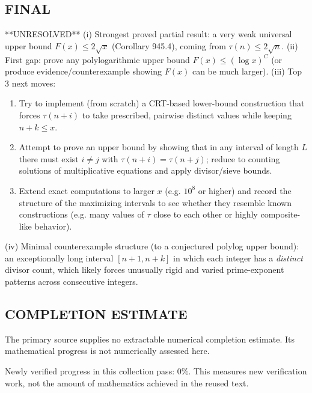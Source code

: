 \subsection*{FINAL}
**UNRESOLVED**
(i) Strongest proved partial result: a very weak universal upper bound $F(x)\le 2\sqrt{x}$ (Corollary 945.4), coming from $\tau(n)\le 2\sqrt{n}$.
(ii) First gap: prove any polylogarithmic upper bound $F(x)\le (\log x)^C$ (or produce evidence/counterexample showing $F(x)$ can be much larger).
(iii) Top 3 next moves:
\begin{enumerate}
\item Try to implement (from scratch) a CRT-based lower-bound construction that forces $\tau(n+i)$ to take prescribed, pairwise distinct values while keeping $n+k\le x$.
\item Attempt to prove an upper bound by showing that in any interval of length $L$ there must exist $i\ne j$ with $\tau(n+i)=\tau(n+j)$; reduce to counting solutions of multiplicative equations and apply divisor/sieve bounds.
\item Extend exact computations to larger $x$ (e.g. $10^8$ or higher) and record the structure of the maximizing intervals to see whether they resemble known constructions (e.g. many values of $\tau$ close to each other or highly composite-like behavior).
\end{enumerate}
(iv) Minimal counterexample structure (to a conjectured polylog upper bound): an exceptionally long interval $[n+1,n+k]$ in which each integer has a \emph{distinct} divisor count, which likely forces unusually rigid and varied prime-exponent patterns across consecutive integers.




\subsection*{COMPLETION ESTIMATE}
The primary source supplies no extractable numerical completion estimate. Its mathematical progress is not numerically assessed here.

Newly verified progress in this collection pass: $0\%$. This measures new verification work, not the amount of mathematics achieved in the reused text.

